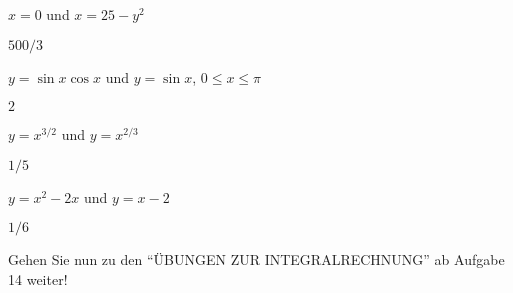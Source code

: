 \begin{exercises}
\begin{exercise} $x=0$ und $x=25-y^2$
\begin{answer} $500/3$
\end{answer}\end{exercise}

\begin{exercise} $y=\sin x\cos x$ und $y=\sin x$, $0\le x\le \pi$
\begin{answer} $2$
\end{answer}\end{exercise}

\begin{exercise} $y=x^{3/2}$ und $y=x^{2/3}$
\begin{answer} $1/5$
\end{answer}\end{exercise}

\begin{exercise} $y=x^2-2x$ und $y=x-2$
\begin{answer} $1/6$
\end{answer}\end{exercise}

Gehen Sie nun zu den ``ÜBUNGEN ZUR INTEGRALRECHNUNG'' ab Aufgabe 14 weiter!
\end{exercises}

